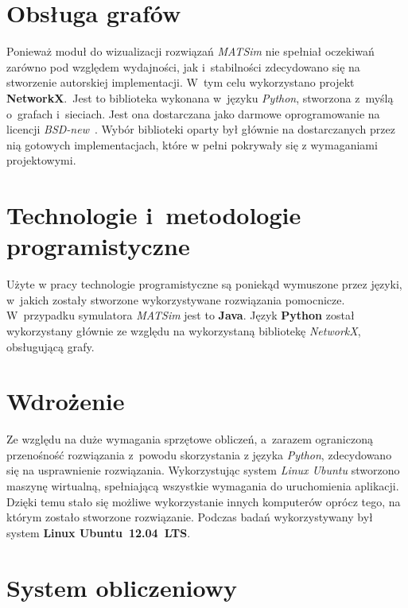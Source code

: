 \documentclass[twoside,12pt]{report}
\begin{document}
\section{Obsługa grafów}\label{rozdz.obsluga_grafow}

Ponieważ moduł do wizualizacji rozwiązań \textit{MATSim} nie spełniał  oczekiwań zarówno pod względem wydajności, jak i~stabilności zdecydowano się na stworzenie autorskiej implementacji. W~tym celu wykorzystano projekt \textbf{NetworkX}.~Jest to biblioteka wykonana w~języku \textit{Python}, stworzona z~myślą o~grafach i~sieciach. Jest ona dostarczana jako darmowe oprogramowanie na licencji \textit{BSD-new}~\cite{networkx}. Wybór biblioteki oparty był głównie na dostarczanych przez nią gotowych implementacjach, które w pełni pokrywały się z wymaganiami projektowymi.

\section{Technologie i~metodologie programistyczne}

Użyte w pracy technologie programistyczne są poniekąd wymuszone przez języki, w~jakich zostały stworzone wykorzystywane rozwiązania pomocnicze. W~przypadku symulatora \textit{MATSim} jest to \textbf{Java}. Język \textbf{Python} został wykorzystany głównie ze względu na wykorzystaną bibliotekę \textit{NetworkX}, obsługującą grafy.

\section{Wdrożenie}\label{sec:wdrozenie}

Ze względu na duże wymagania sprzętowe obliczeń, a~zarazem ograniczoną przenośność rozwiązania z~powodu skorzystania z języka \textit{Python}, zdecydowano się na usprawnienie rozwiązania. Wykorzystując system \textit{Linux Ubuntu} stworzono maszynę wirtualną, spełniającą wszystkie wymagania do uruchomienia aplikacji. Dzięki temu stało się możliwe wykorzystanie innych komputerów oprócz tego, na którym zostało stworzone rozwiązanie. Podczas badań wykorzystywany był system \textbf{Linux Ubuntu~12.04~LTS}\cite{ubuntu}.

\section{System obliczeniowy}
\end{document}
